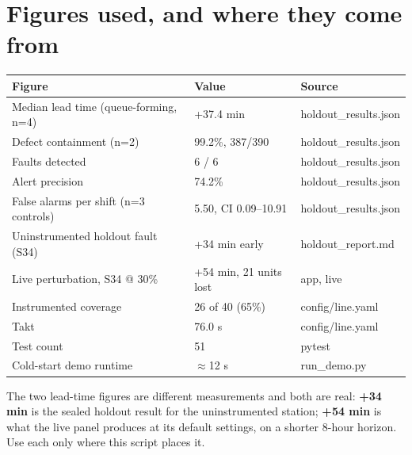 \documentclass[11pt,a4paper]{article}
\begin{document}
\section*{Figures used, and where they come from}
\begin{center}
\small
\begin{tabular}{@{}lll@{}}
\toprule
\textbf{Figure} & \textbf{Value} & \textbf{Source} \\
\midrule
Median lead time (queue-forming, n=4) & +37.4 min & holdout\_results.json \\
Defect containment (n=2)              & 99.2\%, 387/390 & holdout\_results.json \\
Faults detected                       & 6 / 6 & holdout\_results.json \\
Alert precision                       & 74.2\% & holdout\_results.json \\
False alarms per shift (n=3 controls) & 5.50, CI 0.09--10.91 & holdout\_results.json \\
Uninstrumented holdout fault (S34)    & +34 min early & holdout\_report.md \\
Live perturbation, S34 @ 30\%         & +54 min, 21 units lost & app, live \\
Instrumented coverage                 & 26 of 40 (65\%) & config/line.yaml \\
Takt                                  & 76.0 s & config/line.yaml \\
Test count                            & 51 & pytest \\
Cold-start demo runtime               & $\approx$12 s & run\_demo.py \\
\bottomrule
\end{tabular}
\end{center}

\vspace{4pt}
{\small\color{dim}\noindent The two lead-time figures are different measurements
and both are real: \textbf{+34 min} is the sealed holdout result for the
uninstrumented station; \textbf{+54 min} is what the live panel produces at its
default settings, on a shorter 8-hour horizon. Use each only where this script
places it.}
\end{document}
